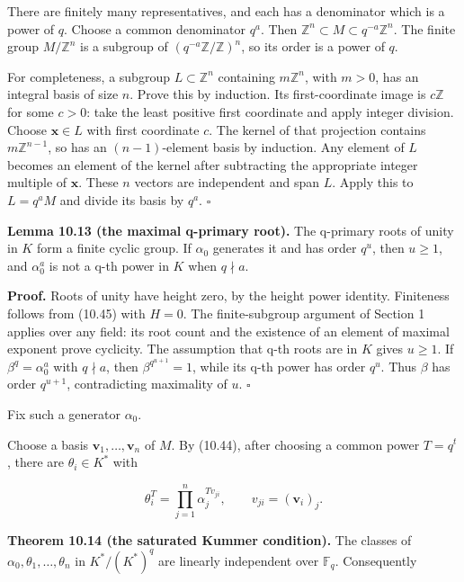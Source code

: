 \documentclass[
  11pt,
  a4paper,
]{article}
\begin{document}
There are finitely many representatives, and each has a denominator
which is a power of \(q\). Choose a common denominator \(q^a\). Then
\(\mathbb Z^n\subset M\subset q^{-a}\mathbb Z^n\). The finite group
\(M/\mathbb Z^n\) is a subgroup of \((q^{-a}\mathbb Z/\mathbb Z)^n\), so
its order is a power of \(q\).

For completeness, a subgroup \(L\subset\mathbb Z^n\) containing
\(m\mathbb Z^n\), with \(m>0\), has an integral basis of size \(n\).
Prove this by induction. Its first-coordinate image is \(c\mathbb Z\)
for some \(c>0\): take the least positive first coordinate and apply
integer division. Choose \(\boldsymbol x\in L\) with first coordinate
\(c\). The kernel of that projection contains \(m\mathbb Z^{n-1}\), so
has an \((n-1)\)-element basis by induction. Any element of \(L\)
becomes an element of the kernel after subtracting the appropriate
integer multiple of \(\boldsymbol x\). These \(n\) vectors are
independent and span \(L\). Apply this to \(L=q^aM\) and divide its
basis by \(q^a\). \(\square\)

\textbf{Lemma 10.13 (the maximal q-primary root).} The q-primary roots
of unity in \(K\) form a finite cyclic group. If \(\alpha_0\) generates
it and has order \(q^u\), then \(u\ge1\), and \(\alpha_0^a\) is not a
q-th power in \(K\) when \(q\nmid a\).

\textbf{Proof.} Roots of unity have height zero, by the height power
identity. Finiteness follows from (10.45) with \(H=0\). The
finite-subgroup argument of Section 1 applies over any field: its root
count and the existence of an element of maximal exponent prove
cyclicity. The assumption that q-th roots are in \(K\) gives \(u\ge1\).
If \(\beta^q=\alpha_0^a\) with \(q\nmid a\), then \(\beta^{q^{u+1}}=1\),
while its q-th power has order \(q^u\). Thus \(\beta\) has order
\(q^{u+1}\), contradicting maximality of \(u\). \(\square\)

Fix such a generator \(\alpha_0\).

Choose a basis \(\boldsymbol v_1,\ldots,\boldsymbol v_n\) of \(M\). By
(10.44), after choosing a common power \(T=q^t\), there are
\(\theta_i\in K^*\) with

\[
 \theta_i^T=\prod_{j=1}^n\alpha_j^{T v_{ji}},
 \qquad v_{ji}=(\boldsymbol v_i)_j.
\tag{10.47}
\]

\textbf{Theorem 10.14 (the saturated Kummer condition).} The classes of
\(\alpha_0,\theta_1,\ldots,\theta_n\) in \(K^*/(K^*)^q\) are linearly
independent over \(\mathbb F_q\). Consequently
\end{document}
